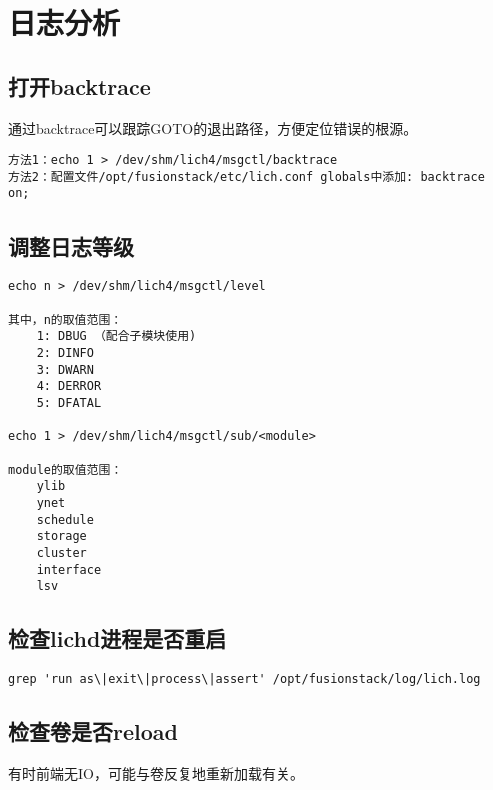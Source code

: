 \section{日志分析}

\subsection{打开backtrace}

通过backtrace可以跟踪GOTO的退出路径，方便定位错误的根源。

\begin{lstlisting}
方法1：echo 1 > /dev/shm/lich4/msgctl/backtrace
方法2：配置文件/opt/fusionstack/etc/lich.conf globals中添加: backtrace on;
\end{lstlisting}

\subsection{调整日志等级}

\begin{lstlisting}
echo n > /dev/shm/lich4/msgctl/level

其中，n的取值范围：
    1: DBUG （配合子模块使用)
    2: DINFO
    3: DWARN
    4: DERROR
    5: DFATAL

echo 1 > /dev/shm/lich4/msgctl/sub/<module>

module的取值范围：
    ylib
    ynet
    schedule
    storage
    cluster
    interface
    lsv
\end{lstlisting}


\subsection{检查lichd进程是否重启}


\begin{lstlisting}
grep 'run as\|exit\|process\|assert' /opt/fusionstack/log/lich.log
\end{lstlisting}

\subsection{检查卷是否reload}

有时前端无IO，可能与卷反复地重新加载有关。


